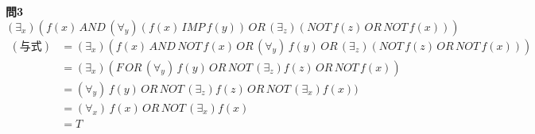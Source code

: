 \documentclass[dvipdfmx,10pt, a4j]{jarticle}
\theoremstyle{definition}
\begin{document}
    \noindent
    \textbf{問3} $(\exists_x)(f(x)\, AND \, (\forall_y)(f(x)\, IMP\, f(y))\, OR\, (\exists_z)(NOT\, f(z)\, OR\, NOT\, f(x)))$ \\
    \begin{align*}
        (与式) &= (\exists_x)(f(x)\, AND \,NOT\, f(x)\, OR\, (\forall_y)\, f(y)\, OR\, (\exists_z)(NOT\, f(z)\, OR\, NOT\, f(x)))\\
        &= (\exists_x)(F\, OR\, (\forall_y)\, f(y)\, OR\, NOT\, (\exists_z)f(z)\, OR\, NOT\, f(x))\\
        &= (\forall_y)\, f(y)\, OR\, NOT\, (\exists_z)f(z)\, OR\, NOT\, (\exists_x)f(x))\\
        &= (\forall_x)\, f(x)\, OR\, NOT\, (\exists_x)f(x)\\
        &= T\\
    \end{align*}
\end{document}
